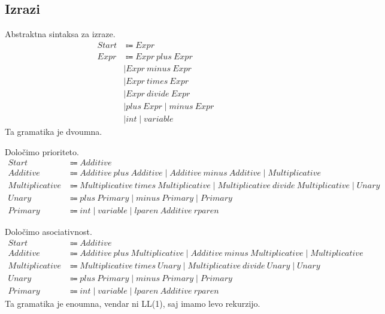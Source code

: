 \documentclass{report}
\newcommand{\Spc}{\ }
\newcommand{\Union}{\mathrel{|}}
\newcommand{\Arrow}{\Coloneq}
\newcommand{\NT}[1]{{#1}}
\newcommand{\T}[1]{{#1}}
\begin{document}
    \subsection*{Izrazi}

    Abstraktna sintaksa za izraze.
    \begin{align*}
      \NT{Start} &\Arrow \NT{Expr}\\
      \NT{Expr} &\Arrow \NT{Expr} \Spc \T{plus} \Spc \NT{Expr}\\
      &\Union \NT{Expr} \Spc \T{minus} \Spc \NT{Expr}\\
      &\Union \NT{Expr} \Spc \T{times} \Spc \NT{Expr}\\
      &\Union \NT{Expr} \Spc \T{divide} \Spc \NT{Expr}\\
      &\Union \T{plus} \Spc \NT{Expr} \Union \T{minus} \Spc \NT{Expr}\\
      &\Union \T{int} \Union \T{variable}
    \end{align*}
    Ta gramatika je dvoumna.

    Določimo prioriteto.
    \begin{align*}
      \NT{Start} &\Arrow \NT{Additive}\\
      \NT{Additive} &\Arrow \NT{Additive} \Spc \T{plus} \Spc \NT{Additive} \Union \NT{Additive} \Spc \T{minus} \Spc \NT{Additive} \Union \NT{Multiplicative}\\
      \NT{Multiplicative} &\Arrow \NT{Multiplicative} \Spc \T{times} \Spc \NT{Multiplicative} \Union \NT{Multiplicative} \Spc \T{divide} \Spc \NT{Multiplicative} \Union \NT{Unary}\\
      \NT{Unary} &\Arrow \T{plus} \Spc \NT{Primary} \Union \T{minus} \Spc \NT{Primary} \Union \NT{Primary}\\ 
      \NT{Primary} &\Arrow \T{int} \Union \T{variable} \Union \T{lparen} \Spc \NT{Additive} \Spc \T{rparen}
    \end{align*}

    Določimo asociativnost.
    \begin{align*}
      \NT{Start} &\Arrow \NT{Additive}\\
      \NT{Additive} &\Arrow \NT{Additive} \Spc \T{plus} \Spc \NT{Multiplicative} \Union \NT{Additive} \Spc \T{minus} \Spc \NT{Multiplicative} \Union \NT{Multiplicative}\\
      \NT{Multiplicative} &\Arrow \NT{Multiplicative} \Spc \T{times} \Spc \NT{Unary} \Union \NT{Multiplicative} \Spc \T{divide} \Spc \NT{Unary} \Union \NT{Unary}\\
      \NT{Unary} &\Arrow \T{plus} \Spc \NT{Primary} \Union \T{minus} \Spc \NT{Primary} \Union \NT{Primary}\\ 
      \NT{Primary} &\Arrow \T{int} \Union \T{variable} \Union \T{lparen} \Spc \NT{Additive} \Spc \T{rparen}
    \end{align*}
    Ta gramatika je enoumna, vendar ni LL(1), saj imamo levo rekurzijo.
\end{document}
